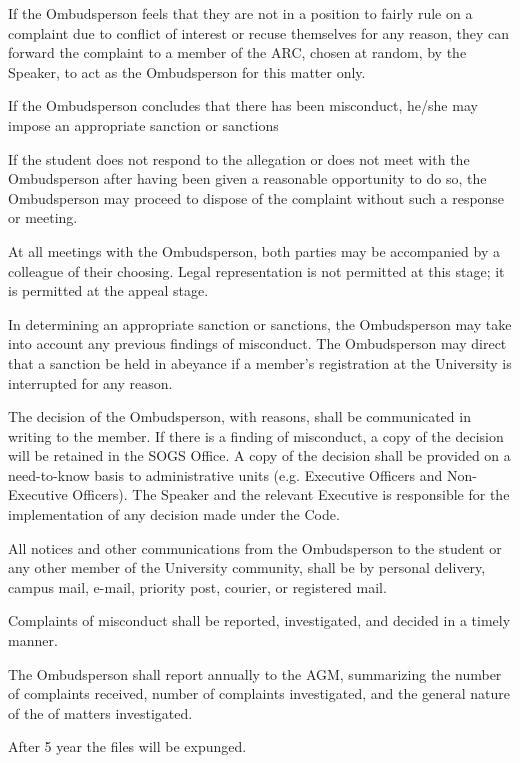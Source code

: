 \begin{longenum}[ label*=\arabic*., align=left]
\begin{longenum}[ label*=\arabic*., align=left]
           \begin{longenum}[ label*=\arabic*., align=left]
           \item If the Ombudsperson feels that they are not in a position to fairly rule on a complaint  due  to  conflict  of  interest  or  recuse themselves for any reason, they can forward  the  complaint  to  a  member  of  the  ARC,  chosen  at  random,  by  the Speaker, to act as the Ombudsperson for this matter only. 
           \end{longenum}
           \item If the Ombudsperson concludes that there has been misconduct, he/she may impose an appropriate sanction or sanctions
           \item If  the  student  does  not  respond  to  the  allegation  or  does  not  meet  with  the Ombudsperson   after   having   been   given   a   reasonable   opportunity   to   do   so,   the Ombudsperson  may  proceed  to  dispose  of  the  complaint  without  such  a  response  or meeting.
           \item At  all  meetings  with  the  Ombudsperson,  both  parties  may  be  accompanied  by  a colleague  of  their  choosing.  Legal  representation  is  not  permitted  at  this  stage;  it  is permitted at the appeal stage.
          \item In determining an appropriate sanction or sanctions, the Ombudsperson may take into account  any  previous  findings  of  misconduct.  The  Ombudsperson  may  direct  that  a sanction be held in abeyance if a member's registration at the University is interrupted for any reason.
           \item The decision of the Ombudsperson, with reasons, shall be communicated in writing to the member. If there is a finding of misconduct, a copy of the decision will be retained in the  SOGS  Office.  A  copy  of  the  decision  shall  be  provided  on  a  need-to-know  basis  to administrative  units  (e.g.  Executive  Officers  and  Non-Executive  Officers).  The  Speaker and  the  relevant  Executive  is  responsible  for  the  implementation  of  any  decision  made under the Code.
          \item All notices and other communications from the Ombudsperson to the student or any other member of the University community, shall be by personal delivery, campus mail, e-mail, priority post, courier, or registered mail. 
          \item Complaints  of  misconduct  shall  be  reported,  investigated,  and  decided  in  a  timely manner.
          \item The  Ombudsperson  shall  report  annually  to  the  AGM,  summarizing  the  number  of complaints received, number of complaints investigated, and the general nature of the of matters investigated.
          \item After 5 year the files will be expunged.
   

\end{longenum}
\end{longenum}
